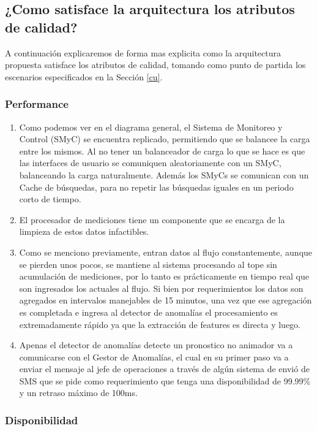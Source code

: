 \documentclass{article}
\theoremstyle{definition}
\theoremstyle{remark}
\begin{document}
\pagebreak

\subsection{¿Como satisface la arquitectura los atributos de calidad?}

A continuación explicaremos de forma mas explicita como la arquitectura propuesta satisface los atributos de calidad, tomando como punto de partida los escenarios especificados en la Sección \ref{cu}.

\subsubsection{Performance}

\begin{enumerate}
  \item Como podemos ver en el diagrama general, el Sistema de Monitoreo y Control (SMyC) se encuentra replicado, permitiendo que se balancee la carga entre los mismos. Al no tener un balanceador de carga lo que se hace es que las interfaces de usuario se comuniquen aleatoriamente con un SMyC, balanceando la carga naturalmente. Además los SMyCs se comunican con un Cache de búsquedas, para no repetir las búsquedas iguales en un periodo corto de tiempo.
  \item El procesador de mediciones tiene un componente que se encarga de la limpieza de estos datos infactibles.
  \item Como se menciono previamente, entran datos al flujo constantemente, aunque se pierden unos pocos, se mantiene al sistema procesando al tope sin acumulación de mediciones, por lo tanto es prácticamente en tiempo real que son ingresados los actuales al flujo. Si bien por requerimientos los datos son agregados en intervalos manejables de 15 minutos, una vez que ese agregación es completada e ingresa al detector de anomalías el procesamiento es extremadamente rápido ya que la extracción de features es directa y luego.
  \item Apenas el detector de anomalías detecte un pronostico no animador va a comunicarse con el Gestor de Anomalías, el cual en su primer paso va a enviar el mensaje al jefe de operaciones a través de algún sistema de envió de SMS que se pide como requerimiento que tenga una disponibilidad de 99.99\% y un retraso máximo de 100ms.
\end{enumerate}

\subsubsection{Disponibilidad}
\end{document}
